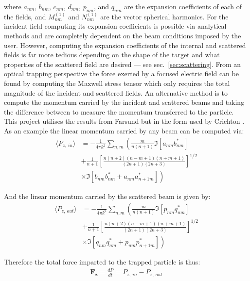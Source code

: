 where $a_{nm}$, $b_{nm}$, $c_{nm}$, $d_{nm}$, $p_{nm}$, and $q_{nm}$
are the expansion coefficients of each of the fields, and $M^{(1)}_{nm}$ 
and $N^{(1)}_{nm}$ are the vector spherical harmonics. For the incident
field computing its expansion coefficients is possible via analytical
methods and are completely dependent on the beam conditions imposed by
the user. However, computing the expansion coefficients of the
internal and scattered fields is far more tedious depending on the
shape of the target and what properties of the scattered field are
desired --- see sec.~\ref{sec:scattering}.  From an optical
trapping perspective the force exerted by a focused electric field can
be found by computing the Maxwell stress tensor which only requires
the total magnitude of the incident and scattered fields. An alternative
method is to compute the momentum carried by the incident and scattered
beams and taking the difference between to measure the momentum 
transferred to the particle. This project utilises the results from 
Farsund \cite{Farsund1996} but in the form used by Crichton 
\cite{Crichton2000THEMD}. As an example the linear momentum carried 
by any beam can be computed via:
\begin{equation}
	\label{eq:linear_momentum_in}
	\begin{split}
		\langle P_{z,\ in} \rangle
		&=
		-\frac{1}{4\pi k^2}\sum_{n,m} \left(\frac{m}{n(n+1)}\Im[a_{nm}b^*_{nm}] \right.
		\\ 
		&+\frac{1}{n+1}\left[\frac{n(n+2)(n-m+1)(n+m+1)}{(2n+1)(2n+3)} \right]^{1/2}
		\\
		& \left.\times\Im[b_{nm}b^*_{nm}+a_{nm}a^*_{n+1m}] \right)
	\end{split}
\end{equation}

And the linear momentum carried by the scattered beam is given by:
\begin{equation}
	\label{eq:linear_momentum_out}
	\begin{split}
		\langle P_{z,\ out} \rangle
		&=
		-\frac{1}{4\pi k^2}\sum_{n,m} \left(\frac{m}{n(n+1)}\Im[p_{nm}q^*_{nm}] \right.
		\\ 
		&+\frac{1}{n+1}\left[\frac{n(n+2)(n-m+1)(n+m+1)}{(2n+1)(2n+3)} \right]^{1/2}
		\\
		& \left.\times\Im[q_{nm}q^*_{nm}+p_{nm}p^*_{n+1m}] \right)
	\end{split}
\end{equation}

Therefore the total force imparted to the trapped particle is thus:
\begin{align}
	\boldsymbol{F_z} =\frac{dP}{dt} = P_{z,\ in} -P_{z,\ out}
\end{align}

